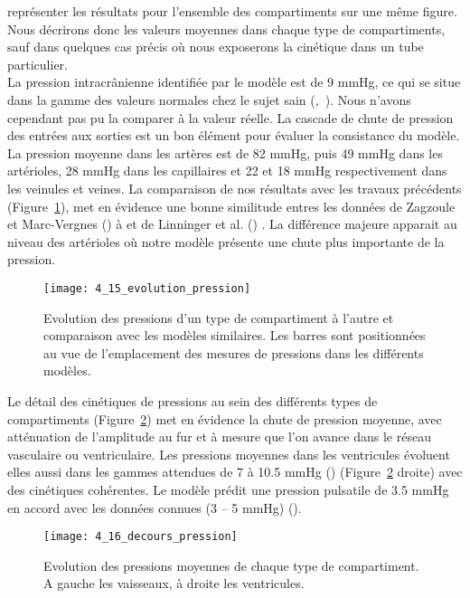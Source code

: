 représenter les résultats pour l’ensemble des compartiments sur une même figure. Nous décrirons
donc les valeurs moyennes dans chaque type de compartiments, sauf dans quelques cas précis où nous
exposerons la cinétique dans un tube particulier.\\
La pression intracrânienne identifiée par le modèle est de 9 mmHg, ce qui se situe dans la
gamme des valeurs normales chez le sujet sain (\cite{Steiner2006},~\cite{Pattinson2005}). Nous n’avons cependant pas pu la comparer
à la valeur réelle. La cascade de chute de pression des entrées aux sorties est un bon élément pour
évaluer la consistance du modèle. La pression moyenne dans les artères est de 82 mmHg, puis 49
mmHg dans les artérioles, 28 mmHg dans les capillaires et 22 et 18 mmHg respectivement dans les
veinules et veines. La comparaison de nos résultats avec les travaux précédents (Figure~\ref{fig:4_15_evolution_pression}), met en
évidence une bonne similitude entres les données de Zagzoule et Marc-Vergnes (\cite{Zagzoule1986}) à et de Linninger
et al. (\cite{Linninger2009}) . La différence majeure apparait au niveau des artérioles où notre modèle présente une chute
plus importante de la pression.\\
\begin{figure}[!t]
\centering
\texttt{[image: 4\_15\_evolution\_pression]}
\caption{Evolution des pressions d'un type de compartiment à l'autre et comparaison avec les modèles similaires. Les
barres sont positionnées au vue de l’emplacement des mesures de pressions dans les différents modèles.}
\label{fig:4_15_evolution_pression}	
\end{figure}
Le détail des cinétiques de pressions au sein des différents types de compartiments (Figure~\ref{fig:4_16_decours_pression})
met en évidence la chute de pression moyenne, avec atténuation de l’amplitude au fur et à mesure
que l’on avance dans le réseau vasculaire ou ventriculaire. Les pressions moyennes dans les ventricules
évoluent elles aussi dans les gammes attendues de 7 à 10.5 mmHg (\cite{Agamanolis2011}) (Figure~\ref{fig:4_16_decours_pression} droite) avec des
cinétiques cohérentes. Le modèle prédit une pression pulsatile de 3.5 mmHg en accord avec les
données connues (3 – 5 mmHg) (\cite{Czosnyka2005}).\\
\begin{figure}[!t]
\centering
\texttt{[image: 4\_16\_decours\_pression]}
\caption{Evolution des pressions moyennes de chaque type de compartiment. A gauche les vaisseaux, à droite les
ventricules.}
\label{fig:4_16_decours_pression}	
\end{figure}
